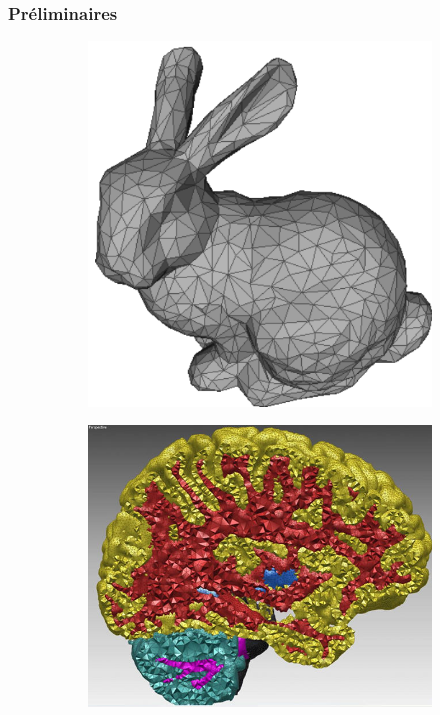 \documentclass[9pt]{beamer}
\begin{document}
\begin{frame}
\small
\frametitle{Préliminaires}
\begin{figure}[H]
\centering
\begin{subfigure}{.5\textwidth}
  \centering
  \includegraphics[scale=0.10]{../Images/bunny}
  \caption{}
\end{subfigure}%
\begin{subfigure}{.5\textwidth}
  \centering
  \includegraphics[scale=0.10]{../Images/cerveau}

\end{subfigure}
\end{figure}
\end{frame}
\end{document}
